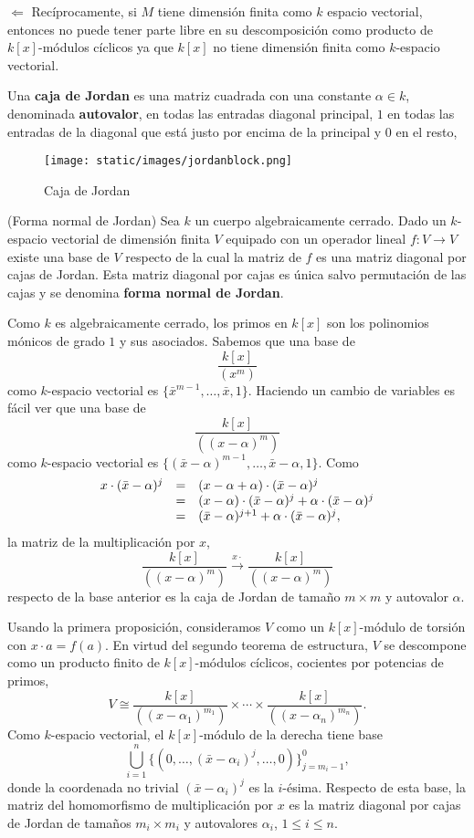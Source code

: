 \(\Leftarrow\) Recíprocamente, si \(M\) tiene dimensión finita como
\(k\) espacio vectorial, entonces no puede tener parte libre en su
descomposición como producto de \(k[x]\)-módulos cíclicos ya que
\(k[x]\) no tiene dimensión finita como \(k\)-espacio vectorial.

Una \textbf{caja de Jordan} es una matriz cuadrada con una constante
\(\alpha \in k\), denominada \textbf{autovalor}, en todas las entradas
diagonal principal, \(1\) en todas las entradas de la diagonal que está
justo por encima de la principal y \(0\) en el resto,

\begin{figure}
\centering
\texttt{[image: static/images/jordanblock.png]}
\caption{Caja de Jordan}
\end{figure}

\textrm{\normalfont (Forma normal de Jordan)} Sea \(k\)
un cuerpo algebraicamente cerrado. Dado un \(k\)-espacio vectorial de
dimensión finita \(V\) equipado con un operador lineal
\(f\colon V\rightarrow V\) existe una base de \(V\) respecto de la cual
la matriz de \(f\) es una matriz diagonal por cajas de Jordan. Esta
matriz diagonal por cajas es única salvo permutación de las cajas y se
denomina \textbf{forma normal de Jordan}. 


Como \(k\) es algebraicamente cerrado, los primos en \(k[x]\) son los
polinomios mónicos de grado \(1\) y sus asociados. Sabemos que una base
de \[\frac{k[x]}{(x^m)}\] como \(k\)-espacio vectorial es
\(\{\bar x^{m-1},\dots,\bar x,1\}\). Haciendo un cambio de variables
es fácil ver que una base de \[\frac{k[x]}{((x-\alpha)^m)}\] como
\(k\)-espacio vectorial es
\(\{(\bar x-\alpha)^{m-1},\dots,\bar x-\alpha,1\}\). Como
\[\begin{array}{rcl}
x\cdot(\bar x-\alpha)^j&=&(x-\alpha+\alpha)\cdot(\bar x-\alpha)^j\cr
&=&(x-\alpha)\cdot(\bar x-\alpha)^j+\alpha\cdot(\bar x-\alpha)^j\cr
&=&(\bar x-\alpha)^{j+1}+\alpha\cdot(\bar x-\alpha)^j,
\end{array}\] la matriz de la multiplicación por \(x\),
\[\frac{k[x]}{((x-\alpha)^m)}\stackrel{x\cdot}\longrightarrow \frac{k[x]}{((x-\alpha)^m)}\]
respecto de la base anterior es la caja de Jordan de tamaño
\(m\times m\) y autovalor \(\alpha\).

Usando la primera proposición, consideramos \(V\) como un
\(k[x]\)-módulo de torsión con \(x\cdot a=f(a)\). En virtud del segundo
teorema de estructura, \(V\) se descompone como un producto finito de
\(k[x]\)-módulos cíclicos, cocientes por potencias de primos,
\[V\cong\frac{k[x]}{((x-\alpha_1)^{m_1})}\times\cdots\times \frac{k[x]}{((x-\alpha_n)^{m_n})}.\]
Como \(k\)-espacio vectorial, el \(k[x]\)-módulo de la derecha tiene
base
\[\bigcup_{i=1}^n\{(0,\dots,(\bar x-\alpha_i)^j,\dots,0)\}_{j=m_i-1}^0,\]
donde la coordenada no trivial \((\bar x-\alpha_i)^j\) es la
\(i\)-ésima. Respecto de esta base, la matriz del homomorfismo de
multiplicación por \(x\) es la matriz diagonal por cajas de Jordan de
tamaños \(m_i\times m_i\) y autovalores \(\alpha_i\),
\(1\leq i\leq n\).

